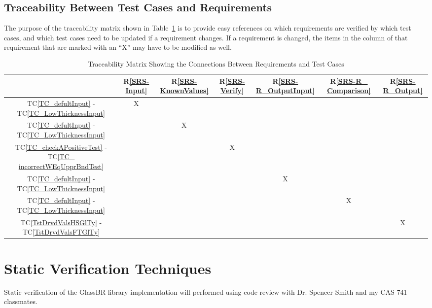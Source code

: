 \documentclass[12pt, titlepage]{article}
\newcommand{\rref}[1]{R\ref{#1}}
\newcommand{\tcref}[1]{TC\ref{#1}}
\newcommand{\progname}{GlassBR}
\begin{document}
\subsection{Traceability Between Test Cases and Requirements}

\noindent The purpose of the traceability matrix shown in 
Table~\ref{Table:T_trace} is to provide easy 
references on which requirements are verified by which test cases, and which 
test cases need to be updated if a requirement changes.  If a requirement is 
changed, the items in the column of that requirement that are marked
with an ``X'' may have to be modified as well. 

\begin{table}[!h]
	\centering
	\begin{tabular}{|c|c|c|c|c|c|c|}
		\hline
		& \rref{SRS-Input}& \rref{SRS-KnownValues}& \rref{SRS-Verify}& \rref{SRS-R_OutputInput}& 
		\rref{SRS-R_ Comparison}& \rref{SRS-R_Output}\\
		\hline
		\tcref{TC_defultInput} - \tcref{TC_LowThicknessInput}                 
		& X& & & & &  \\ \hline
		\tcref{TC_defultInput} - \tcref{TC_LowThicknessInput}                 
		& &X & & & &  \\ \hline
		\tcref{TC_checkAPositiveTest} - \tcref{TC_ incorrectWEqUpprBndTest} 
		& & & X& & & \\ \hline
		\tcref{TC_defultInput} - \tcref{TC_LowThicknessInput}                             
		& & & &X& &   \\ \hline
		\tcref{TC_defultInput} - \tcref{TC_LowThicknessInput}                              
		& & & & &X &   \\ \hline
		\tcref{TstDrvdValsHSGlTy} - \tcref{TstDrvdValsFTGlTy}                                                
		& & & & & &X  \\ \hline
		
		\hline
	\end{tabular}
	\caption{Traceability Matrix Showing the Connections Between Requirements 
	and Test Cases}
	\label{Table:T_trace}
\end{table}

\section{Static Verification Techniques} \label{sec_Static}

Static verification of the \progname{} library implementation will performed using
code review with Dr. Spencer Smith and my CAS 741 classmates.
\end{document}
